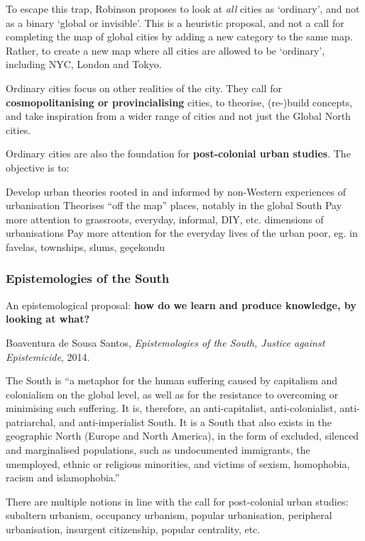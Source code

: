 \documentclass{article}
\begin{document}
To escape this trap, Robinson proposes to look at \textit{all} cities as `ordinary', and not as a binary `global or invisible'. This is a heuristic proposal, and not a call for completing the map of global cities by adding a new category to the same map. Rather, to create a new map where all cities are allowed to be `ordinary', including NYC, London and Tokyo. 

Ordinary cities focus on other realities of the city. They call for \textbf{cosmopolitanising or provincialising} cities, to theorise, (re-)build concepts, and take inspiration from a wider range of cities and not just the Global North cities. 

Ordinary cities are also the foundation for \textbf{post-colonial urban studies}. The objective is to:

\begin{outline}
	\1 Develop urban theories rooted in and informed by non-Western experiences of urbanisation
	\1 Theorises ``off the map'' places, notably in the global South
	\1 Pay more attention to grassroots, everyday, informal, DIY, etc. dimensions of urbanisations
	\1 Pay more attention for the everyday lives of the urban poor, eg. in favelas, townships, slums, geçekondu
\end{outline}

\subsubsection{Epistemologies of the South}

An epistemological proposal: \textbf{how do we learn and produce knowledge, by looking at what?}

Boaventura de Sousa Santos, \textit{Epistemologies of the South, Justice against Epistemicide}, 2014.

The South is ``a metaphor for the human suffering caused by capitalism and colonialism on the global level, as well as for the resistance to overcoming or minimising such suffering. It is, therefore, an anti-capitalist, anti-colonialist, anti-patriarchal, and anti-imperialist South. It is a South that also exists in the geographic North (Europe and North America), in the form of excluded, silenced and marginalised populations, such as undocumented immigrants, the unemployed, ethnic or religious minorities, and victims of sexism, homophobia, racism and islamophobia.''

There are multiple notions in line with the call for post-colonial urban studies: subaltern urbanism, occupancy urbanism, popular urbanisation, peripheral urbanisation, insurgent citizenship, popular centrality, etc.
\end{document}
